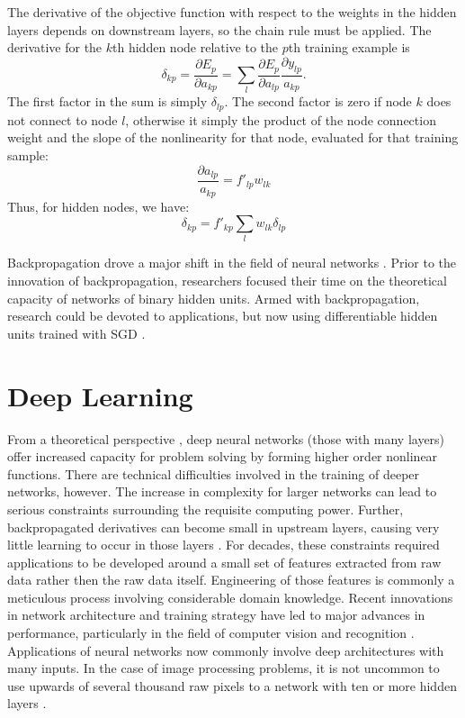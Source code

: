 The derivative of the objective function with respect to the weights in the hidden layers depends on downstream layers, so the chain rule must be applied.  The derivative for the $k$th hidden node relative to the $p$th training example is
\begin{equation}
\delta_{kp} = \frac{\partial E_p}{\partial a_{kp}} = \sum_l \frac{\partial E_p}{\partial a_{lp}}\frac{\partial y_{lp}}{a_{kp}}.
\end{equation}
The first factor in the sum is simply $\delta_{lp}$.  The second factor is zero if node $k$ does not connect to node $l$, otherwise it simply the product of the node connection weight and the slope of the nonlinearity for that node, evaluated for that training sample:
\begin{equation}
\frac{\partial a_{lp}}{a_{kp}} = f'_{lp} w_{lk}
\end{equation}
Thus, for hidden nodes, we have:
\begin{equation}
\delta_{kp} = f'_{kp} \sum_l w_{lk}\delta_{lp}
\end{equation}

Backpropagation drove a major shift in the field of neural networks \cite{reed1999neural}.
Prior to the innovation of backpropagation, researchers focused their time on the theoretical capacity of networks of binary hidden units.
Armed with backpropagation, research could be devoted to applications, but now
using differentiable hidden units trained with SGD \cite{reed1999neural}.


\section{Deep Learning}
\label{deeplearning}

From a theoretical perspective \cite{reed1999neural},
deep neural networks (those with many layers) offer increased capacity for
problem solving by forming higher order nonlinear functions.  There are technical difficulties involved in the training of deeper networks, however.
The increase in complexity for larger networks can lead to serious constraints
surrounding the requisite computing power.
Further, backpropagated derivatives can become small in upstream layers, causing very little learning to occur in those layers
\cite{reed1999neural,szegedy2014going}.
For decades, these constraints required applications to be developed around a small set of features extracted from raw data rather then the raw data itself.  Engineering of those features is commonly a meticulous process involving considerable domain knowledge.  Recent innovations in network architecture and training strategy have led to major advances in performance, particularly in the field of computer vision and recognition \cite{lecun2015deep}.
Applications of neural networks now commonly involve deep architectures with many inputs.
In the case of image processing problems, it is not uncommon to use upwards of several thousand raw pixels to a network with ten or more hidden layers
\cite{lecun2015deep}.

